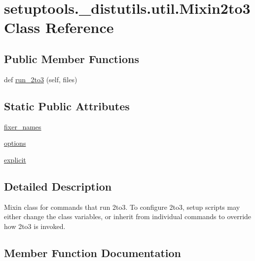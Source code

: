 \hypertarget{classsetuptools_1_1__distutils_1_1util_1_1Mixin2to3}{}\section{setuptools.\+\_\+distutils.\+util.\+Mixin2to3 Class Reference}
\label{classsetuptools_1_1__distutils_1_1util_1_1Mixin2to3}
\subsection*{Public Member Functions}
\begin{DoxyCompactItemize}
\item 
def \hyperlink{classsetuptools_1_1__distutils_1_1util_1_1Mixin2to3_a1ce04a7cc230a1ecdc88876743f9c7b3}{run\+\_\+2to3} (self, files)
\end{DoxyCompactItemize}
\subsection*{Static Public Attributes}
\begin{DoxyCompactItemize}
\item 
\hyperlink{classsetuptools_1_1__distutils_1_1util_1_1Mixin2to3_aafe6248fead546984f0a2b3f87701926}{fixer\+\_\+names}
\item 
\hyperlink{classsetuptools_1_1__distutils_1_1util_1_1Mixin2to3_a1990de05f221e518e0b5825fa76cdc14}{options}
\item 
\hyperlink{classsetuptools_1_1__distutils_1_1util_1_1Mixin2to3_a518f2c0c3efcdf96b65b7dbf3117fa58}{explicit}
\end{DoxyCompactItemize}


\subsection{Detailed Description}
\begin{DoxyVerb}Mixin class for commands that run 2to3.
To configure 2to3, setup scripts may either change
the class variables, or inherit from individual commands
to override how 2to3 is invoked.\end{DoxyVerb}
 

\subsection{Member Function Documentation}
\mbox{\label{classsetuptools_1_1__distutils_1_1util_1_1Mixin2to3_a1ce04a7cc230a1ecdc88876743f9c7b3}} 
